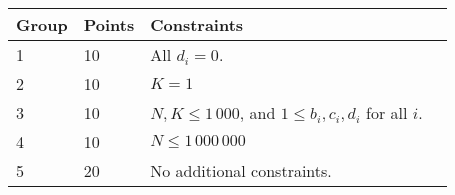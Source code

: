 \noindent
\begin{tabular}{| l | l | l | l |}
\hline
Group & Points & Constraints \\ \hline
1     & 10     & All $d_i = 0$. \\ \hline
2     & 10     & $K = 1$ \\ \hline
3     & 10     & $N, K \le 1\,000$, and $1 \le b_i, c_i, d_i$ for all $i$. \\ \hline
4     & 10     & $N \le 1\,000\,000$ \\ \hline
5     & 20     & No additional constraints. \\ \hline
\end{tabular}

